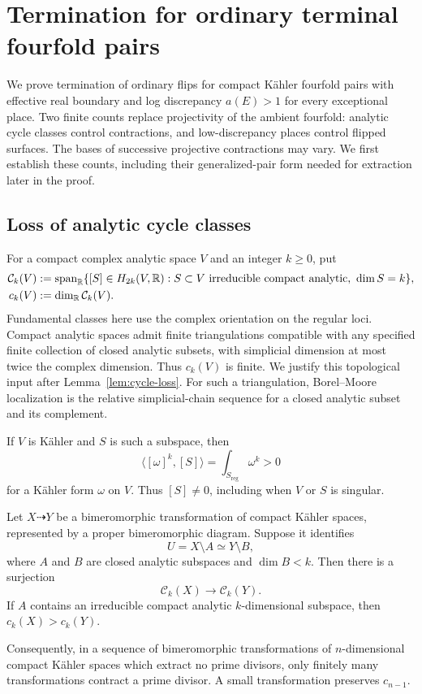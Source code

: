 \section{Termination for ordinary terminal fourfold pairs}\label{sec:counts}

We prove termination of ordinary flips for compact K\"ahler fourfold
pairs with effective real boundary and log discrepancy $a(E)>1$
for every exceptional place.  Two finite counts
replace projectivity of the ambient fourfold: analytic cycle classes
control contractions, and low-discrepancy places control flipped surfaces.
The bases of successive projective contractions may vary.
We first establish these counts, including their generalized-pair form
needed for extraction later in the proof.

\subsection{Loss of analytic cycle classes}

For a compact complex analytic space $V$ and an integer $k\geq 0$, put
\[
 \begin{split}
 \mathcal C_k(V)
 &:=\operatorname{span}_{\mathbb R}\{[S]\in H_{2k}(V,\mathbb R):
                  S\subset V\text{ irreducible compact analytic},\ \dim S=k\},\\
 c_k(V)&:=\dim_{\mathbb R}\mathcal C_k(V).
 \end{split}
\]
Fundamental classes here use the complex orientation on the regular loci.
Compact analytic spaces admit finite triangulations compatible with any
specified finite collection of closed analytic subsets, with simplicial
dimension at most twice the complex dimension.  Thus $c_k(V)$ is finite.
We justify this topological input after Lemma~\ref{lem:cycle-loss}.
For such a triangulation, Borel--Moore localization is the relative
simplicial-chain sequence for a closed analytic subset and its complement.

If $V$ is K\"ahler and $S$ is such a subspace, then
\begin{equation}\label{eq:positive-cycle}
 \langle[\omega]^k,[S]\rangle=\int_{S_{\mathrm{reg}}}\omega^k>0
\end{equation}
for a K\"ahler form $\omega$ on $V$.  Thus $[S]\neq 0$, including when
$V$ or $S$ is singular.

\begin{lemma}\label{lem:cycle-loss}
Let $X\dashrightarrow Y$ be a bimeromorphic transformation of compact
K\"ahler spaces, represented by a proper bimeromorphic diagram.
Suppose it identifies
\[
 U=X\setminus A\simeq Y\setminus B,
\]
where $A$ and $B$ are closed analytic subspaces and $\dim B<k$.
Then there is a surjection
\[
 \mathcal C_k(X)\longrightarrow\mathcal C_k(Y).
\]
If $A$ contains an irreducible compact analytic $k$-dimensional subspace,
then $c_k(X)>c_k(Y)$.

Consequently, in a sequence of bimeromorphic transformations of
$n$-dimensional compact K\"ahler spaces which extract no prime divisors,
only finitely many transformations contract a prime divisor.  A small
transformation preserves $c_{n-1}$.
\end{lemma}

